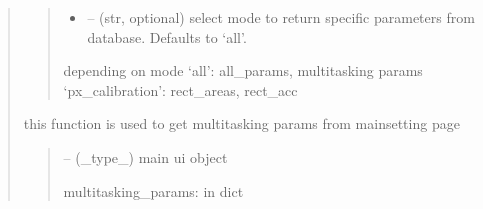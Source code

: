 \documentclass[letterpaper,10pt,english]{sphinxmanual}
\begin{document}
\begin{quote}
\begin{savenotes}
\begin{fulllineitems}
\begin{quote}
\begin{description}
\begin{itemize}
\item {} 
\sphinxAtStartPar
{} – (str, optional) select mode to return specific parameters from database. Defaults to ‘all’.

\end{itemize}

\sphinxAtStartPar
depending on mode
‘all’: all\_params, multitasking params
‘px\_calibration’: rect\_areas, rect\_acc

\end{description}\end{quote}

\end{fulllineitems}\end{savenotes}


\begin{savenotes}\begin{fulllineitems}
\label{\detokenize{setting/backend/mainsetting_funcs:oxin.backend.mainsetting_funcs.get_multitasking_params_from_ui}}
\pysigstartsignatures
{}
\pysigstopsignatures
\sphinxAtStartPar
this function is used to get multitasking params from main\sphinxhyphen{}setting page
\begin{quote}\begin{description}
\sphinxAtStartPar
{} – (\_type\_) main ui object

\sphinxAtStartPar
multitasking\_params: in dict

\end{description}\end{quote}

\end{fulllineitems}\end{savenotes}



\end{quote}
\end{document}
